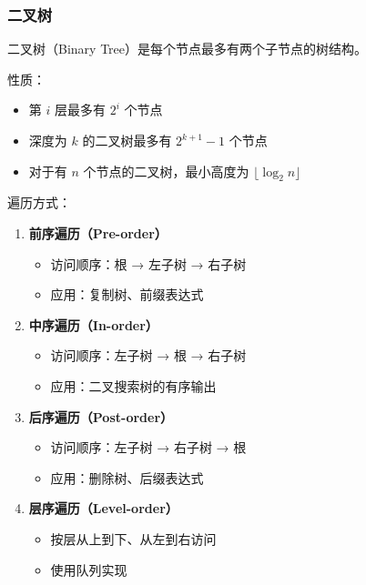 \subsubsection{二叉树}

二叉树（Binary Tree）是每个节点最多有两个子节点的树结构。

性质：
\begin{itemize}
  \item 第 $i$ 层最多有 $2^i$ 个节点
  \item 深度为 $k$ 的二叉树最多有 $2^{k+1} - 1$ 个节点
  \item 对于有 $n$ 个节点的二叉树，最小高度为 $\lfloor \log_2 n \rfloor$
\end{itemize}

遍历方式：
\begin{enumerate}
  \item \textbf{前序遍历（Pre-order）}
    \begin{itemize}
      \item 访问顺序：根 → 左子树 → 右子树
      \item 应用：复制树、前缀表达式
    \end{itemize}

  \item \textbf{中序遍历（In-order）}
    \begin{itemize}
      \item 访问顺序：左子树 → 根 → 右子树
      \item 应用：二叉搜索树的有序输出
    \end{itemize}

  \item \textbf{后序遍历（Post-order）}
    \begin{itemize}
      \item 访问顺序：左子树 → 右子树 → 根
      \item 应用：删除树、后缀表达式
    \end{itemize}

  \item \textbf{层序遍历（Level-order）}
    \begin{itemize}
      \item 按层从上到下、从左到右访问
      \item 使用队列实现
    \end{itemize}
\end{enumerate}

